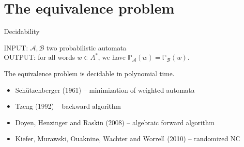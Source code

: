 \documentclass[svgnames]{beamer}
\renewcommand{\AA}{\mathcal{A}}
\newcommand{\BB}{\mathcal{B}}
\newcommand{\prob}[1]{\mathbb{P}_{#1}}
\begin{document}
\section{The equivalence problem}

\begin{frame}{Decidability}
\begin{framed}
INPUT: $\AA,\BB$ two probabilistic automata\\
OUTPUT: for all words $w \in A^*$, we have $\prob{\AA}(w) = \prob{\BB}(w)$.
\end{framed}

\begin{theorem}
The equivalence problem is decidable in polynomial time.
\end{theorem}

\pause
\begin{itemize}
	\item Sch\"utzenberger (1961) -- minimization of weighted automata
	\item Tzeng (1992) -- backward algorithm
	\item Doyen, Henzinger and Raskin (2008) -- algebraic forward algorithm
	\item Kiefer, Murawski, Ouaknine, Wachter and Worrell (2010) -- randomized \textrm{NC}
\end{itemize}
\end{frame}

\end{document}
